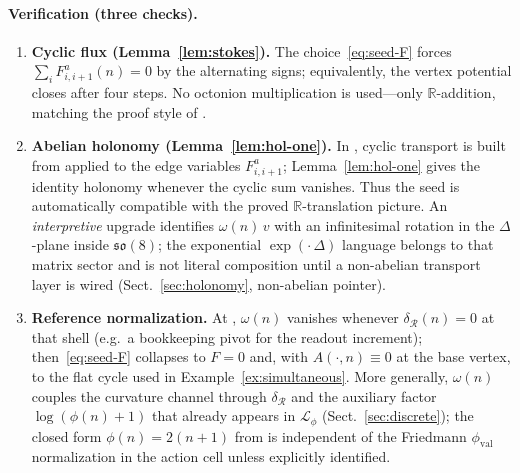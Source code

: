 \documentclass[11pt]{amsart}
\begin{document}
\paragraph{Verification (three checks).}
\begin{enumerate}
\item \textbf{Cyclic flux (Lemma~\ref{lem:stokes}).} The choice~\eqref{eq:seed-F} forces \(\sum_i F^a_{i,i+1}(n)=0\) by the alternating signs; equivalently, the vertex potential closes after four steps. No octonion multiplication is used---only \(\mathbb{R}\)-addition, matching the proof style of .
\item \textbf{Abelian holonomy (Lemma~\ref{lem:hol-one}).} In , cyclic transport is built from  applied to the edge variables \(F^a_{i,i+1}\); Lemma~\ref{lem:hol-one} gives the identity holonomy whenever the cyclic sum vanishes. Thus the seed is automatically compatible with the proved \(\mathbb{R}\)-translation picture. An \emph{interpretive} upgrade identifies \(\omega(n)\,v\) with an infinitesimal rotation in the \(\Delta\)-plane inside \(\mathfrak{so}(8)\); the exponential \(\exp(\cdot\,\Delta)\) language belongs to that matrix sector and is not literal  composition until a non-abelian transport layer is wired (Sect.~\ref{sec:holonomy}, non-abelian pointer).
\item \textbf{Reference normalization.} At , \(\omega(n)\) vanishes whenever \(\delta_{\mathcal{R}}(n)=0\) at that shell (e.g.\ a bookkeeping pivot for the readout increment); then~\eqref{eq:seed-F} collapses to \(F=0\) and, with \(A(\cdot,n)\equiv 0\) at the base vertex, to the flat cycle used in Example~\ref{ex:simultaneous}. More generally, \(\omega(n)\) couples the curvature channel through \(\delta_{\mathcal{R}}\) and the auxiliary factor \(\log(\phi(n)+1)\) that already appears in \(\mathcal{L}_\phi\) (Sect.~\ref{sec:discrete}); the closed form \(\phi(n)=2(n+1)\) from  is independent of the Friedmann \(\phi_{\mathrm{val}}\) normalization in the action cell unless explicitly identified.
\end{enumerate}
\end{document}
